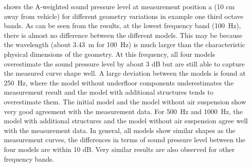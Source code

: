\noindent{} shows the A-weighted sound pressure level at measurement position a (10 cm away from vehicle) for different geometry variations in example one third octave bands. As can be seen from the results, at the lowest frequency band (\SI{100}{\hertz}), there is almost no difference between the different models. This may be because the wavelength (about \SI{3.43}{\meter} for \SI{100}{\hertz}) is much larger than the characteristic physical dimensions of the geometry. At this frequency, all four models overestimate the sound pressure level by about 3 dB but are still able to capture the measured curve shape well. A large deviation between the models is found at \SI{250}{\hertz}, where the model without underfloor components underestimates the measurement result and the model with additional structures tends to overestimate them. The initial model and the model without air suspension show very good agreement with the measurement data. For \SI{500}{\hertz} and \SI{1000}{\hertz}, the model with additional structures and the model without air suspension agree well with the measurement data. In general, all models show similar shapes as the measurement curves, the differences in terms of sound pressure level between the four models are within 10 dB. Very similar results are also observed for other frequency bands.

